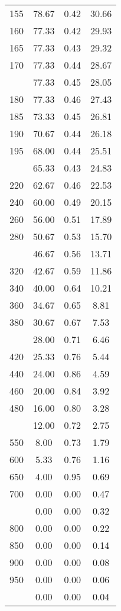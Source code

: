 \begin{table}[ht]
\begin{tabular}{lccc}
  155 & 78.67 & 0.42 & 30.66 \\ 
  160 & 77.33 & 0.42 & 29.93 \\ 
  165 & 77.33 & 0.43 & 29.32 \\ 
  170 & 77.33 & 0.44 & 28.67 \\ 
   \addlinespace
175 & 77.33 & 0.45 & 28.05 \\ 
  180 & 77.33 & 0.46 & 27.43 \\ 
  185 & 73.33 & 0.45 & 26.81 \\ 
  190 & 70.67 & 0.44 & 26.18 \\ 
  195 & 68.00 & 0.44 & 25.51 \\ 
   \addlinespace
200 & 65.33 & 0.43 & 24.83 \\ 
  220 & 62.67 & 0.46 & 22.53 \\ 
  240 & 60.00 & 0.49 & 20.15 \\ 
  260 & 56.00 & 0.51 & 17.89 \\ 
  280 & 50.67 & 0.53 & 15.70 \\ 
   \addlinespace
300 & 46.67 & 0.56 & 13.71 \\ 
  320 & 42.67 & 0.59 & 11.86 \\ 
  340 & 40.00 & 0.64 & 10.21 \\ 
  360 & 34.67 & 0.65 & 8.81 \\ 
  380 & 30.67 & 0.67 & 7.53 \\ 
   \addlinespace
400 & 28.00 & 0.71 & 6.46 \\ 
  420 & 25.33 & 0.76 & 5.44 \\ 
  440 & 24.00 & 0.86 & 4.59 \\ 
  460 & 20.00 & 0.84 & 3.92 \\ 
  480 & 16.00 & 0.80 & 3.28 \\ 
   \addlinespace
500 & 12.00 & 0.72 & 2.75 \\ 
  550 & 8.00 & 0.73 & 1.79 \\ 
  600 & 5.33 & 0.76 & 1.16 \\ 
  650 & 4.00 & 0.95 & 0.69 \\ 
  700 & 0.00 & 0.00 & 0.47 \\ 
   \addlinespace
750 & 0.00 & 0.00 & 0.32 \\ 
  800 & 0.00 & 0.00 & 0.22 \\ 
  850 & 0.00 & 0.00 & 0.14 \\ 
  900 & 0.00 & 0.00 & 0.08 \\ 
  950 & 0.00 & 0.00 & 0.06 \\ 
   \addlinespace
1000 & 0.00 & 0.00 & 0.04 \\ 
   \bottomrule
\end{tabular}
\end{table}
